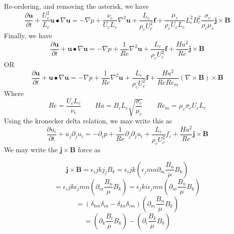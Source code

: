 \documentclass[11pt]{article}
\begin{document}
Re-ordering, and removing the asterisk, we have
\begin{equation}
	\frac{\partial \pmb{u}}{\partial t} + \frac{U_c^2}{L_c} \pmb{u} \bullet \nabla \pmb{u} = 
	- \nabla  p + 
	\frac{\nu_c}{U_c L_c} {\nabla}^2 \pmb{u} + \frac{L_c}{\rho_c U_c^2} \pmb{f} + 
	\frac{\mu_c}{\rho_c U_c L_c} 
	L_c^2 B_c^2 \frac{\sigma_c}{\rho_c \mu_c}
	\pmb{j} \times \pmb{B}
\end{equation}
Finally, we have
\begin{equation}
	\boxed{
	\frac{\partial \pmb{u}}{\partial t} + \pmb{u} \bullet \nabla \pmb{u} = 
	-\nabla  p + 
	\frac{1}{Re} {\nabla}^2 \pmb{u} + \frac{L_c}{\rho_c U_c^2} \pmb{f} + 
	\frac{Ha^2}{Re} \pmb{j} \times \pmb{B}
	}
\end{equation}
OR
\begin{equation}
	\boxed{
	\frac{\partial \pmb{u}}{\partial t} + \pmb{u} \bullet \nabla \pmb{u} = 
	-\nabla  p + 
	\frac{1}{Re} {\nabla}^2 \pmb{u} + \frac{L_c}{\rho_c U_c^2} \pmb{f} + 
	\frac{Ha^2}{Re Re_m} (\nabla \times \pmb{B}) \times \pmb{B}
	}
\end{equation}
Where
\begin{equation}
	Re = \frac{U_c L_c}{\nu_c} \qquad
	Ha = B_c L_c \sqrt{\frac{\sigma_c}{\mu_c}} \qquad
	Re_m = \mu_c \sigma_c U_c L_c
\end{equation}
	Using the kronecker delta relation, we may write this as
\begin{equation}
	\frac{\partial u_i }{\partial t} + u_j \partial_j u_i = 
	-\partial_i  p + 
	\frac{1}{Re} \partial_j \partial_j u_i + 
	\frac{L_c}{\rho_c U_c^2} f_i +
	\frac{Ha^2}{Re} \pmb{j} \times \pmb{B}
\end{equation}
We may write the $\pmb{j}\times \pmb{B}$ force as

\begin{equation}
	\pmb{j}\times \pmb{B} = \epsilon_ijk j_j B_k = 
	\epsilon_ijk \left( \epsilon_jmn \partial_m \frac{B_n}{\mu} B_k \right)
\end{equation}
\begin{equation}
	= \epsilon_ijk \epsilon_jmn \left( \partial_m \frac{B_n}{\mu} B_k \right)
	= \epsilon_jki \epsilon_jmn \left( \partial_m \frac{B_n}{\mu} B_k \right)
\end{equation}
\begin{equation}
	= (\delta_{km} \delta_{in} - \delta_{kn} \delta_{im} ) \left( \partial_m \frac{B_n}{\mu} B_k \right)
\end{equation}
\begin{equation}
	= \left( \partial_k \frac{B_i}{\mu} B_k \right) - 
	\left( \partial_i \frac{B_k}{\mu} B_k \right)
\end{equation}
\end{document}
